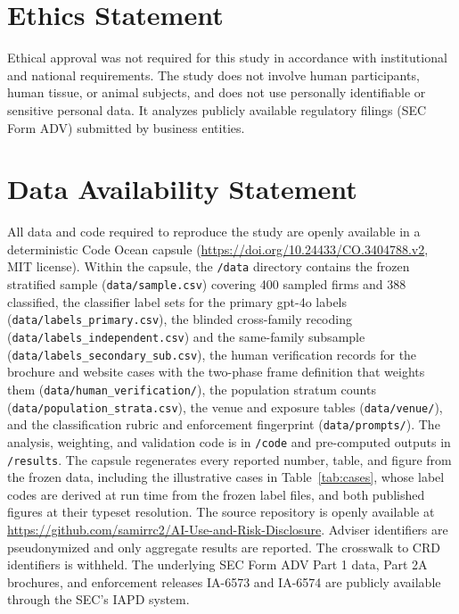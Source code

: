 \documentclass[utf8]{FrontiersinHarvard}
\begin{document}
\section*{Ethics Statement}
Ethical approval was not required for this study in accordance with institutional and national requirements. The study does not involve human participants, human tissue, or animal subjects, and does not use personally identifiable or sensitive personal data. It analyzes publicly available regulatory filings (SEC Form ADV) submitted by business entities.

\section*{Data Availability Statement}
All data and code required to reproduce the study are openly available in a deterministic Code Ocean capsule \citep{capsule2026} (\url{https://doi.org/10.24433/CO.3404788.v2}, MIT license). Within the capsule, the \texttt{/data} directory contains the frozen stratified sample (\texttt{data/sample.csv}) covering 400 sampled firms and 388 classified, the classifier label sets for the primary gpt-4o labels (\texttt{data/labels\_primary.csv}), the blinded cross-family recoding (\texttt{data/labels\_independent.csv}) and the same-family subsample (\texttt{data/labels\_secondary\_sub.csv}), the human verification records for the brochure and website cases with the two-phase frame definition that weights them (\texttt{data/human\_verification/}), the population stratum counts (\texttt{data/population\_strata.csv}), the venue and exposure tables (\texttt{data/venue/}), and the classification rubric and enforcement fingerprint (\texttt{data/prompts/}). The analysis, weighting, and validation code is in \texttt{/code} and pre-computed outputs in \texttt{/results}. The capsule regenerates every reported number, table, and figure from the frozen data, including the illustrative cases in Table~\ref{tab:cases}, whose label codes are derived at run time from the frozen label files, and both published figures at their typeset resolution. The source repository is openly available at \url{https://github.com/samirrc2/AI-Use-and-Risk-Disclosure}. Adviser identifiers are pseudonymized and only aggregate results are reported. The crosswalk to CRD identifiers is withheld. The underlying SEC Form ADV Part 1 data, Part 2A brochures, and enforcement releases IA-6573 and IA-6574 are publicly available through the SEC's IAPD system.



\end{document}
